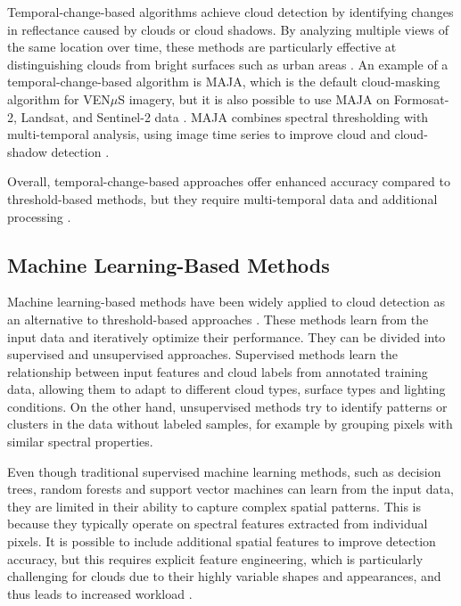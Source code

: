 Temporal-change-based algorithms achieve cloud detection by identifying changes in reflectance caused by clouds or cloud shadows. By analyzing multiple views of the same location over time, these methods are particularly effective at distinguishing clouds from bright surfaces such as urban areas \cite{zhiwei2022}. An example of a temporal-change-based algorithm is MAJA, which is the default cloud-masking algorithm for VEN$\mu$S imagery, but it is also possible to use MAJA on Formosat-2, Landsat, and Sentinel-2 data \cite{hagolle2010}. MAJA combines spectral thresholding with multi-temporal analysis, using image time series to improve cloud and cloud-shadow detection \cite{pesek2022, hagolle2010}.

Overall, temporal-change-based approaches offer enhanced accuracy compared to threshold-based methods, but they require multi-temporal data and additional processing \cite{zhiwei2022, pesek2022}.


\subsection{Machine Learning-Based Methods}
\label{sec:ml_methods} 

Machine learning-based methods have been widely applied to cloud detection as an alternative to threshold-based approaches \cite{singh2025, wang2024}. These methods learn from the input data and iteratively optimize their performance. They can be divided into supervised and unsupervised approaches. Supervised methods learn the relationship between input features and cloud labels from annotated training data, allowing them to adapt to different cloud types, surface types and lighting conditions. On the other hand, unsupervised methods try to identify patterns or clusters in the data without labeled samples, for example by grouping pixels with similar spectral properties.

Even though traditional supervised machine learning methods, such as decision trees, random forests and support vector machines can learn from the input data, they are limited in their ability to capture complex spatial patterns. This is because they typically operate on spectral features extracted from individual pixels. It is possible to include additional spatial features to improve detection accuracy, but this requires explicit feature engineering, which is particularly challenging for clouds due to their highly variable shapes and appearances, and thus leads to increased workload \cite{singh2025, zhiwei2022}.


